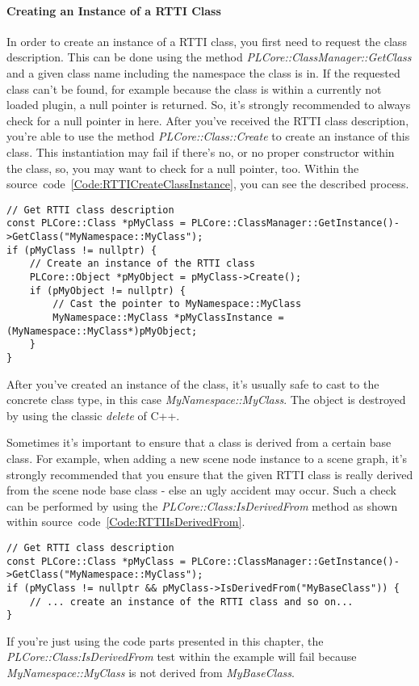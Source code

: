 \paragraph{Creating an Instance of a RTTI Class}
In order to create an instance of a RTTI class, you first need to request the class description. This can be done using the method \emph{PLCore::ClassManager::GetClass} and a given class name including the namespace the class is in. If the requested class can't be found, for example because the class is within a currently not loaded plugin, a null pointer is returned. So, it's strongly recommended to always check for a null pointer in here. After you've received the RTTI class description, you're able to use the method \emph{PLCore::Class::Create} to create an instance of this class. This instantiation may fail if there's no, or no proper constructor within the class, so, you may want to check for a null pointer, too. Within the source~code~\ref{Code:RTTICreateClassInstance}, you can see the described process.
\begin{lstlisting}[float=htb,label=Code:RTTICreateClassInstance,caption={Creating an instance of a RTTI class}]
// Get RTTI class description
const PLCore::Class *pMyClass = PLCore::ClassManager::GetInstance()->GetClass("MyNamespace::MyClass");
if (pMyClass != nullptr) {
	// Create an instance of the RTTI class
	PLCore::Object *pMyObject = pMyClass->Create();
	if (pMyObject != nullptr) {
		// Cast the pointer to MyNamespace::MyClass
		MyNamespace::MyClass *pMyClassInstance = (MyNamespace::MyClass*)pMyObject;
	}
}
\end{lstlisting}
After you've created an instance of the class, it's usually safe to cast to the concrete class type, in this case \emph{MyNamespace::MyClass}. The object is destroyed by using the classic \emph{delete} of C++.

Sometimes it's important to ensure that a class is derived from a certain base class. For example, when adding a new scene node instance to a scene graph, it's strongly recommended that you ensure that the given RTTI class is really derived from the scene node base class - else an ugly accident may occur. Such a check can be performed by using the \emph{PLCore::Class:IsDerivedFrom} method as shown within source~code~\ref{Code:RTTIIsDerivedFrom}.
\begin{lstlisting}[float=htb,label=Code:RTTIIsDerivedFrom,caption={Ensure that a class is derived from a certain base class}]
// Get RTTI class description
const PLCore::Class *pMyClass = PLCore::ClassManager::GetInstance()->GetClass("MyNamespace::MyClass");
if (pMyClass != nullptr && pMyClass->IsDerivedFrom("MyBaseClass")) {
	// ... create an instance of the RTTI class and so on...
}
\end{lstlisting}
If you're just using the code parts presented in this chapter, the \emph{PLCore::Class:IsDerivedFrom} test within the example will fail because \emph{MyNamespace::MyClass} is not derived from \emph{MyBaseClass}.

